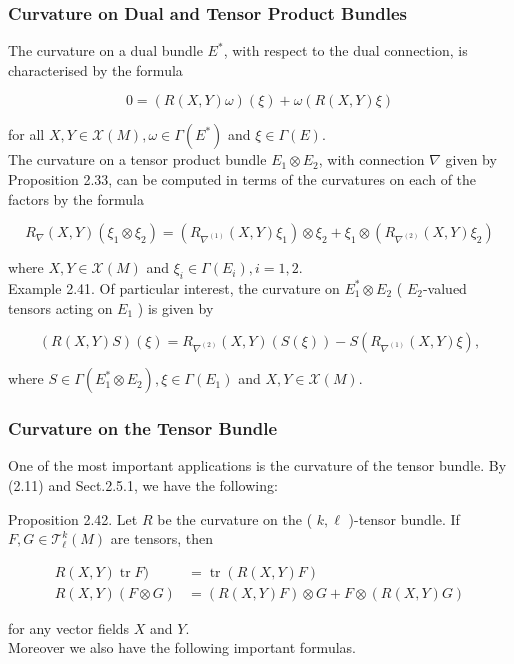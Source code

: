\documentclass[10pt, letterpaper]{article}
\begin{document}
\subsubsection*{Curvature on Dual and Tensor Product Bundles}
The curvature on a dual bundle $E^{*}$, with respect to the dual connection, is characterised by the formula

$$
0=(R(X, Y) \omega)(\xi)+\omega(R(X, Y) \xi)
$$

for all $X, Y \in \mathscr{X}(M), \omega \in \Gamma\left(E^{*}\right)$ and $\xi \in \Gamma(E)$.\\
The curvature on a tensor product bundle $E_{1} \otimes E_{2}$, with connection $\nabla$ given by Proposition 2.33, can be computed in terms of the curvatures on each of the factors by the formula

$$
R_{\nabla}(X, Y)\left(\xi_{1} \otimes \xi_{2}\right)=\left(R_{\nabla^{(1)}}(X, Y) \xi_{1}\right) \otimes \xi_{2}+\xi_{1} \otimes\left(R_{\nabla^{(2)}}(X, Y) \xi_{2}\right)
$$

where $X, Y \in \mathscr{X}(M)$ and $\xi_{i} \in \Gamma\left(E_{i}\right), i=1,2$.\\
Example 2.41. Of particular interest, the curvature on $E_{1}^{*} \otimes E_{2}$ ( $E_{2}$-valued tensors acting on $E_{1}$ ) is given by

$$
(R(X, Y) S)(\xi)=R_{\nabla^{(2)}}(X, Y)(S(\xi))-S\left(R_{\nabla^{(1)}}(X, Y) \xi\right),
$$

where $S \in \Gamma\left(E_{1}^{*} \otimes E_{2}\right), \xi \in \Gamma\left(E_{1}\right)$ and $X, Y \in \mathscr{X}(M)$.

\subsubsection*{Curvature on the Tensor Bundle}
One of the most important applications is the curvature of the tensor bundle. By (2.11) and Sect.2.5.1, we have the following:

Proposition 2.42. Let $R$ be the curvature on the ( $k, \ell$ )-tensor bundle. If $F, G \in \mathscr{T}_{\ell}^{k}(M)$ are tensors, then

$$
\begin{aligned}
R(X, Y) \operatorname{tr} F) & =\operatorname{tr}(R(X, Y) F) \\
R(X, Y)(F \otimes G) & =(R(X, Y) F) \otimes G+F \otimes(R(X, Y) G)
\end{aligned}
$$

for any vector fields $X$ and $Y$.\\
Moreover we also have the following important formulas.
\end{document}
